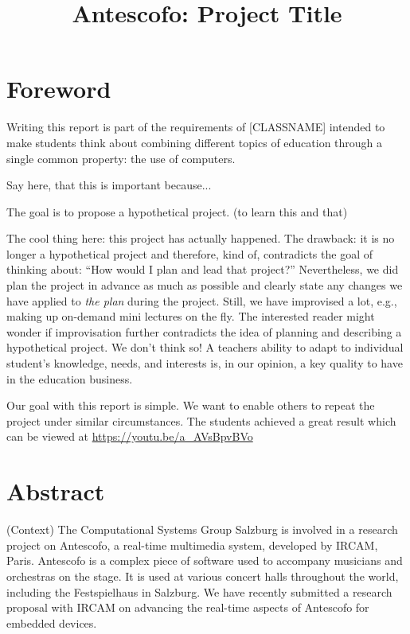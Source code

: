 \documentclass[onecolumn,nocopyrightspace,preprint]{sigplanconf}
\title{Antescofo: Project Title}
\begin{document}
\maketitle

\section{Foreword} 
Writing this report is part of the requirements of [CLASSNAME] intended to
make students think about combining different topics of education through
a single common property: the use of computers.


Say here, that this is important because...

The goal is to propose a hypothetical project. (to learn this and that)

The cool thing here: this project has actually happened. The drawback: it is no longer a hypothetical project
and therefore, kind of, contradicts the goal of thinking about: ``How would I plan and lead that project?''
Nevertheless, we did plan the project in advance as much as possible and clearly state any changes we have applied 
to \textit{the plan} during the project. Still, we have improvised a lot, e.g., making up on-demand mini lectures on the fly.
The interested reader might wonder if improvisation further contradicts the idea of planning and describing a hypothetical project. 
We don't think so! A teachers ability to adapt to individual student's knowledge, needs, and interests is, in our opinion,
a key quality to have in the education business.

Our goal with this report is simple. We want to enable others to repeat the project under similar circumstances.
The students achieved a great result which can be viewed at \url{https://youtu.be/a_AVsBpvBVo}

\section{Abstract} 

(Context) The Computational Systems Group Salzburg is involved in a research
project on Antescofo, a real-time multimedia system, developed by IRCAM,
Paris. Antescofo is a complex piece of software used to accompany musicians
and orchestras on the stage. It is used at various concert halls throughout
the world, including the Festspielhaus in Salzburg. We have recently submitted
a research proposal with IRCAM on advancing the real-time aspects of Antescofo
for embedded devices.
\end{document}
